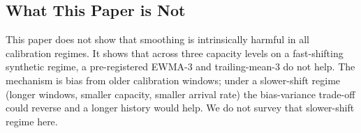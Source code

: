 \subsection{What This Paper is Not}

This paper does not show that smoothing is intrinsically harmful in
all calibration regimes. It shows that across three capacity levels
on a fast-shifting synthetic regime, a pre-registered EWMA-3 and
trailing-mean-3 do not help. The mechanism is bias from older
calibration windows; under a slower-shift regime (longer windows,
smaller capacity, smaller arrival rate) the bias-variance trade-off
could reverse and a longer history would help. We do not survey that
slower-shift regime here.
